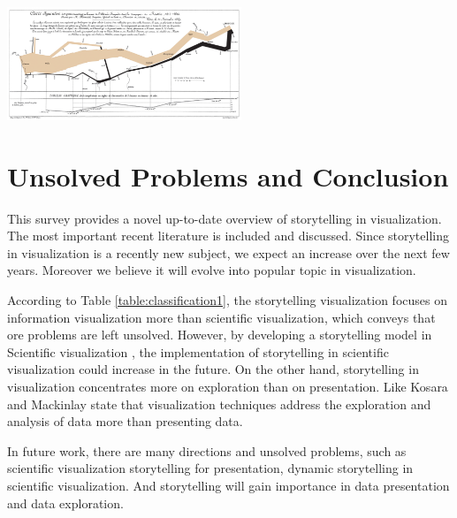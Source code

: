\documentclass{egpubl}
\begin{document}
\begingroup
\centering
\includegraphics[width=7cm]{./images/StorytellingTheNextStepForVisualisation}
\label{fig:StorytellingTheNextStepForVisualisation}
\endgroup


\section{Unsolved Problems and Conclusion}
This survey provides a novel up-to-date overview of storytelling in visualization. The most important recent literature is included and discussed. Since storytelling in visualization is a recently new subject, we expect an increase over the next few years. Moreover we believe it will evolve into popular topic in visualization.


According to Table \ref{table:classification1}, the storytelling visualization focuses on information visualization more than scientific visualization, which conveys that ore problems are left unsolved. However, by developing a storytelling model in Scientific visualization \cite{wohlfart2}, the implementation of storytelling in scientific visualization could increase in the future. On the other hand, storytelling in visualization concentrates more on exploration than on presentation. Like  Kosara and Mackinlay \cite{Kosara} state that visualization techniques address the exploration and analysis of data more than presenting data.

In future work, there are many directions and unsolved problems, such as scientific visualization storytelling for presentation, dynamic storytelling in scientific visualization. And storytelling will gain importance in data presentation and data exploration.



\newpage
%



\end{document}
